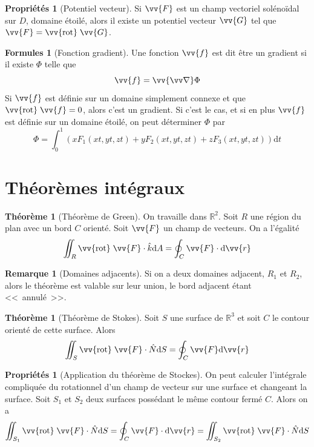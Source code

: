 \documentclass[11pt,a4paper]{article}
\theoremstyle{definition}
\newtheorem{myprop}[mydef]{Propriétés}
\newtheorem{myrem}[mydef]{Remarque}
\newtheorem{myform}[mydef]{Formules}
\newtheorem{mytheo}[mydef]{Théorème}
\newcommand{\R}{\mathbb{R}}
\newcommand{\dif}{\mathrm{d}}
\newcommand{\rot}{\vv{\mathrm{rot}}\;}
\let\oldnabla\nabla
\renewcommand{\nabla}{\vv{\oldnabla}}
\begin{document}
\begin{myprop}[Potentiel vecteur] Si $\vv{F}$ est un champ vectoriel solénoïdal sur $D$, domaine étoilé, alors il existe un potentiel vecteur $\vv{G}$ tel que $\vv{F} = \rot \vv{G}$.
\end{myprop}

\begin{myform}[Fonction gradient]
Une fonction $\vv{f}$ est dit être un gradient si il existe $\Phi$ telle que
\[ \vv{f} = \nabla \Phi \]
Si $\vv{f}$ est définie sur un domaine simplement connexe et que $\rot \vv{f} = 0$, alors c'est un gradient.
Si c'est le cas, et si en plus $\vv{f}$ est définie sur un domaine étoilé, on peut déterminer $\Phi$ par
\[ \Phi = \int_0^1 \left( x F_1(xt,yt,zt) + y F_2(xt,yt,zt) + z F_3(xt,yt,zt) \right) \dif t \]
\end{myform}

\section{Théorèmes intégraux}

\begin{mytheo}[Théorème de Green]
On travaille dans $\R^2$. Soit $R$ une région du plan avec un bord $C$ orienté. Soit $\vv{F}$ un champ de vecteurs. On a l'égalité
\[ \iint_R \rot \vv{F} \cdot \hat{k} \dif A = \oint_C \vv{F} \cdot \dif \vv{r} \]
\end{mytheo}

\begin{myrem}[Domaines adjacents]
Si on a deux domaines adjacent, $R_1$ et $R_2$, alors le théorème est valable sur leur union, le bord adjacent étant <<~annulé~>>.
\end{myrem}

\begin{mytheo}[Théorème de Stokes]
Soit $S$ une surface de $\R^3$ et soit $C$ le contour orienté de cette surface. Alors
\[ \iint_S \rot \vv{F} \cdot \hat{N} \dif S = \oint_C \vv{F} \dif \vv{r} \]
\end{mytheo}

\begin{myprop}[Application du théorème de Stockes]
On peut calculer l'intégrale compliquée du rotationnel d'un champ de vecteur sur une surface et changeant la surface. Soit $S_1$ et $S_2$ deux surfaces possédant le même contour fermé $C$. Alors on a
\[ \iint_{S_1} \rot \vv{F} \cdot \hat{N} \dif S = \oint_C \vv{F} \cdot \dif \vv{r} = \iint_{S_2} \rot \vv{F} \cdot \hat{N} \dif S \]
\end{myprop}
\end{document}
